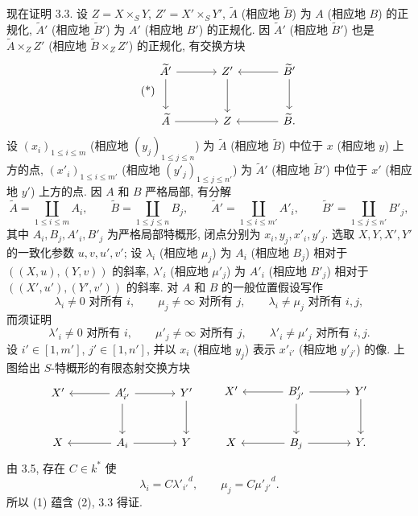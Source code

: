 现在证明 3.3. 设 $Z=X\times_SY$, $Z'=X'\times_SY'$, $\widetilde A$ (相应地 $\widetilde B$) 为 $A$ (相应地 $B$) 的正规化, $\widetilde A'$ (相应地 $\widetilde B'$) 为 $A'$ (相应地 $B'$) 的正规化. 因 $\widetilde A'$ (相应地 $\widetilde B'$) 也是 $\widetilde A\times_ZZ'$ (相应地 $\widetilde B\times_ZZ'$) 的正规化, 有交换方块
\begin{equation}\tag{*}
\begin{tikzcd}[column sep=large,row sep=large]
\widetilde A' \arrow[r] \arrow[d] & Z' \arrow[d] & \widetilde B' \arrow[l] \arrow[d]\\
\widetilde A \arrow[r] & Z & \widetilde B . \arrow[l]
\end{tikzcd}
\end{equation}
设 $(x_i)_{1\le i\le m}$ (相应地 $(y_j)_{1\le j\le n}$) 为 $\widetilde A$ (相应地 $\widetilde B$) 中位于 $x$ (相应地 $y$) 上方的点, $(x'_i)_{1\le i\le m'}$ (相应地 $(y'_j)_{1\le j\le n'}$) 为 $\widetilde A'$ (相应地 $\widetilde B'$) 中位于 $x'$ (相应地 $y'$) 上方的点. 因 $A$ 和 $B$ 严格局部, 有分解
\[
\widetilde A=\coprod_{1\le i\le m}A_i,\qquad
\widetilde B=\coprod_{1\le j\le n}B_j,\qquad
\widetilde A'=\coprod_{1\le i\le m'}A'_i,\qquad
\widetilde B'=\coprod_{1\le j\le n'}B'_j,
\]
其中 $A_i,B_j,A'_i,B'_j$ 为严格局部特概形, 闭点分别为 $x_i,y_j,x'_i,y'_j$. 选取 $X,Y,X',Y'$ 的一致化参数 $u,v,u',v'$; 设 $\lambda_i$ (相应地 $\mu_j$) 为 $A_i$ (相应地 $B_j$) 相对于 $((X,u),(Y,v))$ 的斜率, $\lambda'_i$ (相应地 $\mu'_j$) 为 $A'_i$ (相应地 $B'_j$) 相对于 $((X',u'),(Y',v'))$ 的斜率. 对 $A$ 和 $B$ 的一般位置假设写作
\begin{equation}
\lambda_i\ne0\text{ 对所有 }i,\qquad
\mu_j\ne\infty\text{ 对所有 }j,\qquad
\lambda_i\ne\mu_j\text{ 对所有 }i,j,
\tag{1}
\end{equation}
而须证明
\begin{equation}
\lambda'_i\ne0\text{ 对所有 }i,\qquad
\mu'_j\ne\infty\text{ 对所有 }j,\qquad
\lambda'_i\ne\mu'_j\text{ 对所有 }i,j.
\tag{2}
\end{equation}
设 $i'\in[1,m']$, $j'\in[1,n']$, 并以 $x_i$ (相应地 $y_j$) 表示 $x'_{i'}$ (相应地 $y'_{j'}$) 的像. 上图给出 $S$-特概形的有限态射交换方块
\[
\begin{tikzcd}[column sep=large,row sep=large]
X' & A'_{i'} \arrow[l] \arrow[r] \arrow[d] & Y' \arrow[d]\\
X & A_i \arrow[l] \arrow[r] & Y
\end{tikzcd}
\qquad
\begin{tikzcd}[column sep=large,row sep=large]
X' & B'_{j'} \arrow[l] \arrow[r] \arrow[d] & Y' \arrow[d]\\
X & B_j \arrow[l] \arrow[r] & Y .
\end{tikzcd}
\]
由 3.5, 存在 $C\in k^*$ 使
\[
\lambda_i=C{\lambda'_{i'}}^d,\qquad
\mu_j=C{\mu'_{j'}}^d.
\]
所以 (1) 蕴含 (2), 3.3 得证.

